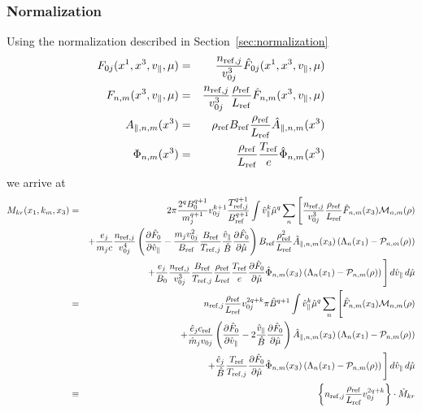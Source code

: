 \subsubsection{Normalization}
Using the normalization described in Section~\ref{sec:normalization}
\begin{eqnarray*}
  F_{0j}(x^1,x^3,v_\|,\mu) &=& \frac{n_{\mathrm{ref},j}}{v_{0j}^3}\hat{F}_{0j}(x^1,x^3,v_\|,\mu)\\
  F_{n,m}(x^3,v_\|,\mu) &=&
  \frac{n_{\mathrm{ref},j}}{v_{0j}^3}\frac{\rho_{\mathrm{ref}}}{L_{\mathrm{ref}}}\hat{F}_{n,m}(x^3,v_\|,\mu)\\
  A_{\|,n,m}(x^3) &=& \rho_{\mathrm{ref}} B_{\mathrm{ref}} \frac{\rho_{\mathrm{ref}}}{L_{\mathrm{ref}}}\hat{A}_{\|,n,m}(x^3)\\
  \Phi_{n,m}(x^3) &=& \frac{\rho_{\mathrm{ref}}}{L_{\mathrm{ref}}} \frac{T_{\mathrm{ref}}}{e} \hat{\Phi}_{n,m}(x^3)
\end{eqnarray*}
we arrive at
\begin{eqnarray}
  M_{kr}(x_1,k_m,x_3) &=& 2\pi\frac{2^qB_0^{q+1}}{m_j^{q+1}} v_{0j}^{k+1}
  \frac{T_{\mathrm{ref},j}^{q+1}}{B_{\mathrm{ref}}^{q+1}}
  \int \hat{v}_\|^k \hat{\mu}^q \sum_n \Bigg[
     \frac{n_{\mathrm{ref},j}}{v_{0j}^3} \frac{\rho_{\mathrm{ref}}}{L_{\mathrm{ref}}}\hat{F}_{n,m}(x_3)\mathcal{M}_{n,m}(\rho) \nonumber \\
    &&+\frac{e_j}{m_jc} \frac{n_{\mathrm{ref},j}}{v_{0j}^4} \left(
      \frac{\partial \hat{F}_0}{\partial \hat{v}_\|}
      -\frac{m_j v_{0j}^2}{B_{\mathrm{ref}}}\frac{B_{\mathrm{ref}}}{T_{\mathrm{ref},j}} \frac{\hat{v}_\|}{\hat{B}}\frac{\partial 
        \hat{F}_0}{\partial \hat{\mu}}
    \right)
    B_{\mathrm{ref}} \frac{\rho_{\mathrm{ref}}^2}{L_{\mathrm{ref}}} \hat{A}_{\|,n,m}(x_3)\left(
      \Lambda_n(x_1)-\mathcal{P}_{n,m}(\rho) \right) \nonumber \\
    &&+\frac{e_j}{B_0} \frac{n_{\mathrm{ref},j}}{v_{0j}^3}\frac{B_{\mathrm{ref}}}{T_{\mathrm{ref},j}} \frac{\rho_{\mathrm{ref}}}{L_{\mathrm{ref}}} \frac{T_{\mathrm{ref}}}{e}
    \frac{\partial\hat{F}_0}{\partial\hat{\mu}}
    \hat{\Phi}_{n,m}(x_3)\left(
      \Lambda_n(x_1)-\mathcal{P}_{n,m}(\rho)
    \right)
  \Bigg]\,d\hat{v}_\|\,d\hat{\mu} \nonumber \\
& = & n_{\mathrm{ref},j} \frac{\rho_{\mathrm{ref}}}{L_{\mathrm{ref}}} v_{0j}^{2q+k} \pi\hat{B}^{q+1} 
   \int \hat{v}_\|^k \hat{\mu}^q \sum_n \Bigg[
     \hat{F}_{n,m}(x_3)\mathcal{M}_{n,m}(\rho)\nonumber \\
     &&+\frac{\hat{e}_j c_{\mathrm{ref}}}{\hat{m}_j v_{0j}} \left(
       \frac{\partial \hat{F}_0}{\partial \hat{v}_\|}
       -2\frac{\hat{v}_\|}{\hat{B}}\frac{\partial\hat{F}_0}{\partial \hat{\mu}}
     \right)
     \hat{A}_{\|,n,m}(x_3)\left(\Lambda_n(x_1)-\mathcal{P}_{n,m}(\rho)
     \right) \nonumber \\
     &&+\frac{\hat{e}_j}{\hat{B}}\frac{T_{\mathrm{ref}}}{T_{\mathrm{ref},j}}
     \frac{\partial\hat{F}_0}{\partial\hat{\mu}}
     \hat{\Phi}_{n,m}(x_3)\left(
       \Lambda_n(x_1)-\mathcal{P}_{n,m}(\rho)
     \right)
   \Bigg]\,d\hat{v}_\|\,d\hat{\mu} \nonumber \\
& \equiv & \left\{n_{\mathrm{ref},j} \frac{\rho_{\mathrm{ref}}}{L_{\mathrm{ref}}} v_{0j}^{2q+k}\right\} \cdot \hat{M}_{kr} \label{eq:mom_norm}
\end{eqnarray}
 
